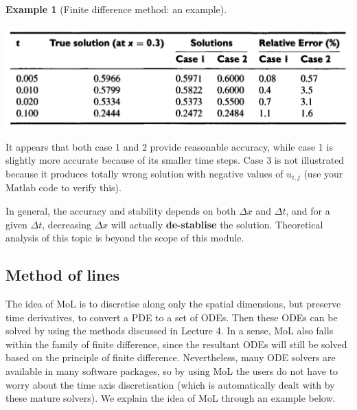 \documentclass[a4paper,11pt]{article}
\theoremstyle{definition}
\newtheorem{exmp}{Example}[section]
\begin{document}
\begin{exmp}[Finite difference method: an example]
 \begin{center}
	\includegraphics[width=.7\textwidth]{fdm_rlt}
 \end{center}

It appears that both case 1 and 2 provide reasonable accuracy, while case 1 is slightly more accurate
because of its smaller time steps. Case 3 is not illustrated because it produces totally wrong solution
with negative values of $u_{i,j}$ (use your Matlab code to verify this).

In general, the accuracy and stability depends on both $\Delta x$ and $\Delta t$, and for a given
$\Delta t$, decreasing $\Delta x$ will actually \textbf{de-stablise} the solution. 
Theoretical analysis of this topic is beyond the scope of this module.

\end{exmp}

\subsection*{Method of lines}

The idea of MoL is to discretise along only the spatial dimensions, but preserve time derivatives,
to convert a PDE to a set of ODEs. Then these ODEs can be solved by using the methods discussed in Lecture 4.
In a sense, MoL also falls within the family of finite difference, since the resultant ODEs will still be solved
based on the principle of finite difference. Nevertheless, many ODE solvers are available in many software packages,
so by using MoL the users do not have to worry about the time axis discretisation (which is automatically
dealt with by these mature solvers). We explain the idea of MoL through an example below.
\end{document}
